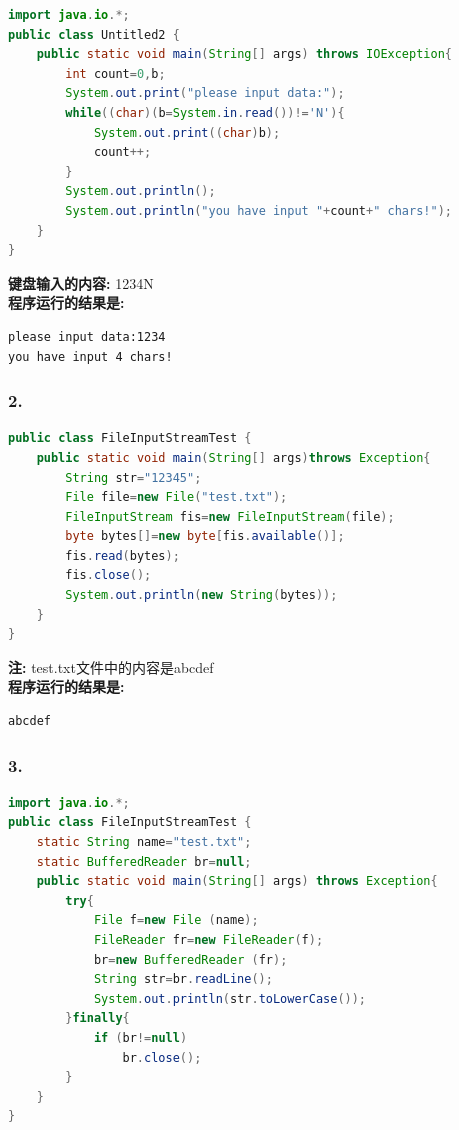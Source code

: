 \documentclass[a4paper,12pt]{article}
\begin{document}
\begin{lstlisting}[language=Java, caption=读取控制台字符]
import java.io.*; 
public class Untitled2 { 
    public static void main(String[] args) throws IOException{
        int count=0,b;
        System.out.print("please input data:");
        while((char)(b=System.in.read())!='N'){
            System.out.print((char)b);
            count++;
        }
        System.out.println();
        System.out.println("you have input "+count+" chars!");
    }
}
\end{lstlisting}

\textbf{键盘输入的内容:} 1234N \\
\textbf{程序运行的结果是:}
\begin{lstlisting}[style=output]
please input data:1234
you have input 4 chars!
\end{lstlisting}

\subsubsection{2.}

\begin{lstlisting}[language=Java, caption=FileInputStream读取文件]
public class FileInputStreamTest {
    public static void main(String[] args)throws Exception{
        String str="12345";
        File file=new File("test.txt");
        FileInputStream fis=new FileInputStream(file);
        byte bytes[]=new byte[fis.available()];
        fis.read(bytes);
        fis.close();
        System.out.println(new String(bytes));
    }
}
\end{lstlisting}

\textbf{注:} test.txt文件中的内容是abcdef \\
\textbf{程序运行的结果是:}
\begin{lstlisting}[style=output]
abcdef
\end{lstlisting}

\subsubsection{3.}

\begin{lstlisting}[language=Java, caption=BufferedReader读取文件]
import java.io.*;
public class FileInputStreamTest {
    static String name="test.txt";
    static BufferedReader br=null;
    public static void main(String[] args) throws Exception{
        try{
            File f=new File (name);
            FileReader fr=new FileReader(f);
            br=new BufferedReader (fr);
            String str=br.readLine();
            System.out.println(str.toLowerCase());
        }finally{ 
            if (br!=null) 
                br.close();
        }
    }
}
\end{lstlisting}
\end{document}
